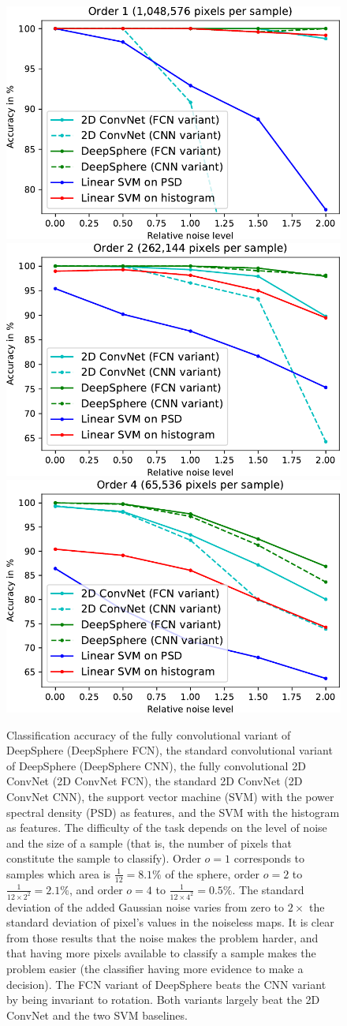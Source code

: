 \documentclass[final,twocolumn,3p,times,sort&compress]{elsarticle}
\newcommand{\1}{\b{1}}              %
\newcommand{\0}{\b{0}}              %
\begin{document}
\begin{figure}
	\centering
	\includegraphics[width=0.32\linewidth]{result_order1}
	\hfill
	\includegraphics[width=0.32\linewidth]{result_order2}
	\hfill
	\includegraphics[width=0.32\linewidth]{result_order4}
	\caption{
		Classification accuracy of the fully convolutional variant of DeepSphere (DeepSphere FCN), the standard convolutional variant of DeepSphere (DeepSphere CNN), the fully convolutional 2D ConvNet (2D ConvNet FCN), the standard 2D ConvNet (2D ConvNet CNN), the support vector machine (SVM) with the power spectral density (PSD) as features, and the SVM with the histogram as features.
		The difficulty of the task depends on the level of noise and the size of a sample (that is, the number of pixels that constitute the sample to classify). Order $o=1$ corresponds to samples which area is $\frac{1}{12}=8.1\%$ of the sphere, order $o=2$ to $\frac{1}{12 \times 2^2} = 2.1\%$, and order $o=4$ to $\frac{1}{12 \times 4^2} = 0.5\%$. The standard deviation of the added Gaussian noise varies from zero to $2\times$ the standard deviation of pixel's values in the noiseless maps.
		It is clear from those results that the noise makes the problem harder, and that having more pixels available to classify a sample makes the problem easier (the classifier having more evidence to make a decision). The FCN variant of DeepSphere beats the CNN variant by being invariant to rotation. Both variants largely beat the 2D ConvNet and the two SVM baselines.
	}
	\label{fig:results}
\end{figure}
\end{document}
